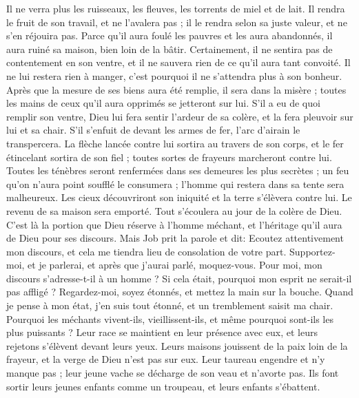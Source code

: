 \begin{multicols}{2}
Il ne verra plus les ruisseaux, les fleuves, les torrents de miel et de lait.
Il rendra le fruit de son travail, et ne l'avalera pas ; il le rendra selon sa juste valeur, et ne s'en réjouira pas.
Parce qu'il aura foulé les pauvres et les aura abandonnés, il aura ruiné sa maison, bien loin de la bâtir. 
Certainement, il ne sentira pas de contentement en son ventre, et il ne sauvera rien de ce qu'il aura tant convoité.
Il ne lui restera rien à manger, c'est pourquoi il ne s'attendra plus à son bonheur.
Après que la mesure de ses biens aura été remplie, il sera dans la misère ; toutes les mains de ceux qu'il aura opprimés se jetteront sur lui.
S'il a eu de quoi remplir son ventre, Dieu lui fera sentir l'ardeur de sa colère, et la fera pleuvoir sur lui et sa chair.
S'il s'enfuit de devant les armes de fer, l'arc d'airain le transpercera.
La flèche lancée contre lui sortira au travers de son corps, et le fer étincelant sortira de son fiel ; toutes sortes de frayeurs marcheront contre lui.
Toutes les ténèbres seront renfermées dans ses demeures les plus secrètes ; un feu qu'on n'aura point soufflé le consumera ; l'homme qui restera dans sa tente sera malheureux.
Les cieux découvriront son iniquité et la terre s'élèvera contre lui. 
Le revenu de sa maison sera emporté. Tout s'écoulera au jour de la colère de Dieu.
C'est là la portion que Dieu réserve à l'homme méchant, et l'héritage qu'il aura de Dieu pour ses discours.
\VerseOne{}Mais Job prit la parole et dit: 
Ecoutez attentivement mon discours, et cela me tiendra lieu de consolation de votre part. 
Supportez-moi, et je parlerai, et après que j'aurai parlé, moquez-vous. 
Pour moi, mon discours s'adresse-t-il à un homme ? Si cela était, pourquoi mon esprit ne serait-il pas affligé ?
Regardez-moi, soyez étonnés, et mettez la main sur la bouche.
Quand je pense à mon état, j'en suis tout étonné, et un tremblement saisit ma chair.
Pourquoi les méchants vivent-ils, vieillissent-ils, et même pourquoi sont-ils les plus puissants ?
Leur race se maintient en leur présence avec eux, et leurs rejetons s'élèvent devant leurs yeux.
Leurs maisons jouissent de la paix loin de la frayeur, et la verge de Dieu n'est pas sur eux. 
Leur taureau engendre et n'y manque pas ; leur jeune vache se décharge de son veau et n'avorte pas.
Ils font sortir leurs jeunes enfants comme un troupeau, et leurs enfants s'ébattent. 

\end{multicols}
